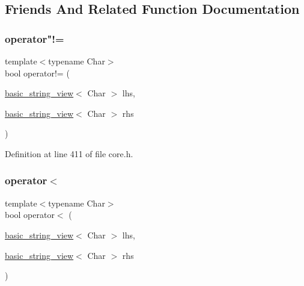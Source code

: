 \subsection{Friends And Related Function Documentation}
\mbox{\label{classbasic__string__view_a5ceb2a1bfa175c69d7bfda735e901d73}} 
\subsubsection{\texorpdfstring{operator"!=}{operator!=}}
{\footnotesize\ttfamily template$<$typename Char$>$ \\
bool operator!= (\begin{DoxyParamCaption}\item[{\hyperlink{classbasic__string__view}{basic\+\_\+string\+\_\+view}$<$ Char $>$}]{lhs,  }\item[{\hyperlink{classbasic__string__view}{basic\+\_\+string\+\_\+view}$<$ Char $>$}]{rhs }\end{DoxyParamCaption})\hspace{0.3cm}{\ttfamily [friend]}}



Definition at line 411 of file core.\+h.

\mbox{\label{classbasic__string__view_a0e53f2258bbcde6cc8426b0a0755029b}} 
\subsubsection{\texorpdfstring{operator$<$}{operator<}}
{\footnotesize\ttfamily template$<$typename Char$>$ \\
bool operator$<$ (\begin{DoxyParamCaption}\item[{\hyperlink{classbasic__string__view}{basic\+\_\+string\+\_\+view}$<$ Char $>$}]{lhs,  }\item[{\hyperlink{classbasic__string__view}{basic\+\_\+string\+\_\+view}$<$ Char $>$}]{rhs }\end{DoxyParamCaption})\hspace{0.3cm}{\ttfamily [friend]}}



